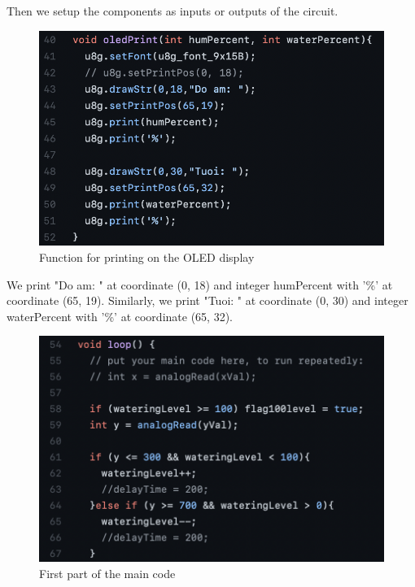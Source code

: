 \documentclass[12pt]{article}
\begin{document}
    Then we setup the components as inputs or outputs of the circuit.
    
    \begin{figure}[H]
        \centering
        \includegraphics{./images/OLED_print.png}
        \caption{Function for printing on the OLED display}
        \label{fig:OLED_print}
    \end{figure}
    
    We print "Do am: " at coordinate (0, 18) and integer humPercent with '\%' at coordinate (65, 19). Similarly, we print "Tuoi: " at coordinate (0, 30) and integer waterPercent with '\%' at coordinate (65, 32).
    
    \begin{figure}[H]
        \centering
        \includegraphics[width=14cm]{./images/main1.png}
        \caption{First part of the main code}
        \label{fig:main1}
    \end{figure}
    
\end{document}

